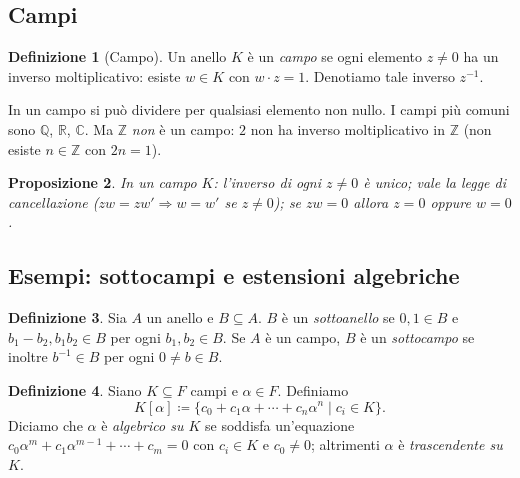 \documentclass[11pt, a4paper]{book}
\theoremstyle{definition}
\newtheorem{definizione}{Definizione}[section]
\theoremstyle{plain}
\newtheorem{proposizione}[definizione]{Proposizione}
\theoremstyle{remark}
\newcommand{\Z}{\mathbb{Z}}
\newcommand{\Q}{\mathbb{Q}}
\newcommand{\R}{\mathbb{R}}
\newcommand{\C}{\mathbb{C}}
\begin{document}
\subsection{Campi}

\begin{defbox}
\begin{definizione}[Campo]
Un anello $K$ è un \emph{campo} se ogni elemento $z \neq 0$ ha un inverso moltiplicativo: esiste $w \in K$ con $w \cdot z = 1$. Denotiamo tale inverso $z^{-1}$.
\end{definizione}
\end{defbox}

In un campo si può dividere per qualsiasi elemento non nullo. I campi più comuni sono $\Q$, $\R$, $\C$. Ma $\Z$ \emph{non} è un campo: $2$ non ha inverso moltiplicativo in $\Z$ (non esiste $n \in \Z$ con $2n = 1$).

\begin{proposizione}
In un campo $K$: l'inverso di ogni $z \neq 0$ è unico; vale la legge di cancellazione ($zw = zw' \Rightarrow w = w'$ se $z \neq 0$); se $zw = 0$ allora $z = 0$ oppure $w = 0$.
\end{proposizione}

\subsection{Esempi: sottocampi e estensioni algebriche}

\begin{defbox}
\begin{definizione}
Sia $A$ un anello e $B \subseteq A$. $B$ è un \emph{sottoanello} se $0, 1 \in B$ e $b_1 - b_2, b_1 b_2 \in B$ per ogni $b_1, b_2 \in B$. Se $A$ è un campo, $B$ è un \emph{sottocampo} se inoltre $b^{-1} \in B$ per ogni $0 \neq b \in B$.
\end{definizione}
\end{defbox}

\begin{defbox}
\begin{definizione}
Siano $K \subseteq F$ campi e $\alpha \in F$. Definiamo
\[
  K[\alpha] \coloneqq \{c_0 + c_1 \alpha + \cdots + c_n \alpha^n \mid c_i \in K\}.
\]
Diciamo che $\alpha$ è \emph{algebrico su $K$} se soddisfa un'equazione $c_0 \alpha^m + c_1 \alpha^{m-1} + \cdots + c_m = 0$ con $c_i \in K$ e $c_0 \neq 0$; altrimenti $\alpha$ è \emph{trascendente su $K$}.
\end{definizione}
\end{defbox}
\end{document}
